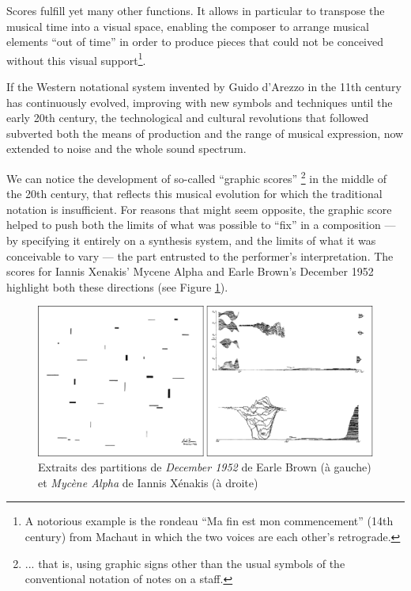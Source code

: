 Scores fulfill yet many other functions. It allows in particular to transpose the musical time into a visual space, enabling the composer to arrange musical elements “out of time” in order to produce pieces that could not be conceived without this visual support\footnote{A notorious example is the rondeau “Ma fin est mon commencement” (14th century) from Machaut in which the two voices are each other's retrograde.}.

If the Western notational system invented by Guido d'Arezzo in the 11th century has continuously evolved, improving with new symbols and techniques until the early 20th century, the technological and cultural revolutions that followed subverted both the means of production and the range of musical expression, now extended to noise and the whole sound spectrum.

We can notice the development of so-called “graphic scores” \footnote{... that is, using graphic signs other than the usual symbols of the conventional notation of notes on a staff.} in the middle of the 20th century, that reflects this musical evolution for which the traditional notation is insufficient. For reasons that might seem opposite, the graphic score helped to push both the limits of what was possible to “fix” in a composition — by specifying it entirely on a synthesis system, and the limits of what it was conceivable to vary — the part entrusted to the performer's interpretation. The scores for Iannis Xenakis' Mycene Alpha and Earle Brown's December 1952 highlight both these directions (see Figure \ref{fig:notation:brown-xenakis}).

\begin{figure}[htb]
	\includegraphics[width=\textwidth]{gfx/notation/Brown-Xenakis-Paysage.png}
	\caption{Extraits des partitions de \textit{December 1952} de Earle Brown (à gauche) et \textit{Mycène Alpha} de Iannis Xénakis (à droite)}
	\label{fig:notation:brown-xenakis}
\end{figure}

